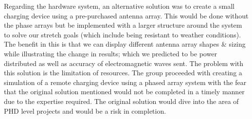 \documentclass[12pt, titlepage]{article}
\begin{document}
\begin{enumerate}
  Regarding the hardware system, an alternative solution was to create a small charging device using a pre-purchased antenna array. This would be done without the phase arrays but be implemented with a larger structure around the system to solve our stretch goals (which include being resistant to weather conditions). The benefit in this is that we can display different antenna array shapes \& sizing while illustrating the change in results; which we predicted to be power distributed as well as accuracy of electromagnetic waves sent. The problem with this solution is the limitation of resources. The group proceeded with creating a simulation of a remote charging device using a phased array system with the fear that the original solution mentioned would not be completed in a timely manner due to the expertise required. The original solution would dive into the area of PHD level projects and would be a risk in completion.   

\end{enumerate}
\end{document}

